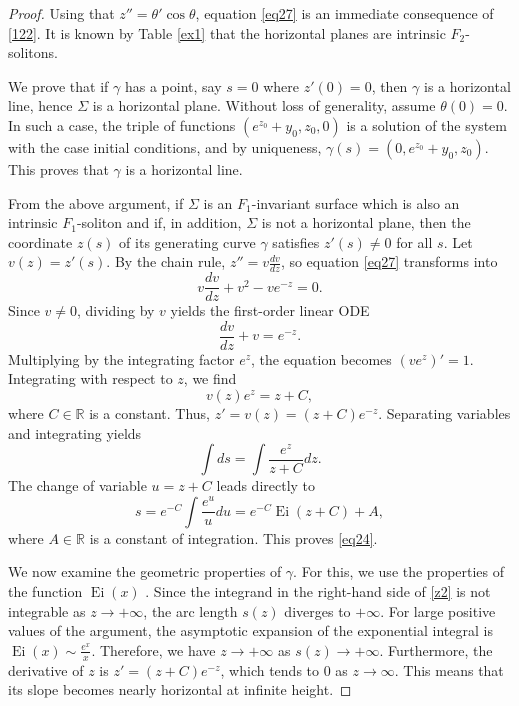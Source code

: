 \documentclass[a4paper,12pt]{amsart}
\theoremstyle{plain}
\theoremstyle{definition}
\def\r{\mathbb R}
\begin{document}
\begin{proof}

Using that $z'' = \theta'\cos\theta$, equation \eqref{eq27} is an immediate consequence of \eqref{122}. It is known by Table \ref{ex1} that the horizontal planes are intrinsic $F_2$-solitons.

We prove that if $\gamma$ has a point, say $s=0$ where $z'(0)=0$, then $\gamma$ is a horizontal line, hence $\Sigma$ is a horizontal plane. Without loss of generality, assume $\theta(0)=0$. In such a case, the triple of functions $(e^{z_0}+y_0,z_0,0)$ is a solution of the system with the case initial conditions, and by uniqueness, $\gamma(s) =(0,e^{z_0}+y_0,z_0)$. This proves that $\gamma$ is a horizontal line.

From the above argument, if $\Sigma$ is an $F_1$-invariant surface which is also an intrinsic $F_1$-soliton and if, in addition, $\Sigma$ is not a horizontal plane, then the coordinate $z(s)$ of its generating curve $\gamma$ satisfies $z'(s)\not=0$ for all $s$. Let $v(z) = z'(s)$. By the chain rule, $z'' = v \frac{dv}{dz}$, so equation \eqref{eq27} transforms into 
$$ v \frac{dv}{dz} + v^2 - v e^{-z} = 0. $$
Since $v\not=0$, dividing by $v$ yields the first-order linear ODE 
$$ \frac{dv}{dz} + v = e^{-z}. $$
Multiplying by the integrating factor $e^z$, the equation becomes $(v e^z)' = 1$. Integrating with respect to $z$, we find 
\begin{equation}\label{v2}
v(z) e^z = z + C,
\end{equation}
where $C \in \r$ is a constant. Thus, $z' = v(z) = (z+C)e^{-z}$. Separating variables and integrating yields 
\begin{equation}\label{z2}
\int ds = \int \frac{e^z}{z+C} dz.
\end{equation}
 The change of variable $u = z+C$ leads directly to 
$$ s = e^{-C} \int \frac{e^u}{u} du = e^{-C} \operatorname{Ei}(z + C) + A, $$
where $A \in \r$ is a constant of integration. This proves \eqref{eq24}. 





We now examine the geometric properties of $\gamma$. For this, we use the properties of the function $\operatorname{Ei}(x)$ \cite{ab}. Since the integrand in the right-hand side of \eqref{z2} is not integrable as $z \to +\infty$, the arc length $s(z)$ diverges to $+\infty$. For large positive values of the argument, the asymptotic expansion of the exponential integral is $\operatorname{Ei}(x) \sim \frac{e^x}{x}$. Therefore, we have $z\to+\infty$ as $s(z)\to+\infty$. Furthermore, the derivative of $z$ is $z'= (z+C)e^{-z}$, which tends to $0$ as $z \to \infty$. This means that its slope becomes nearly horizontal at infinite height.


\end{proof}
\end{document}
